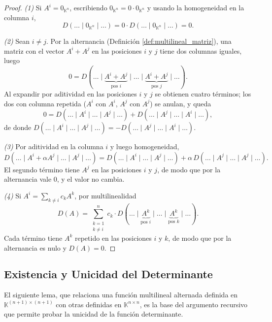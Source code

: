\documentclass[11pt, a4paper]{article}
\begin{document}
\begin{proof}
\textit{(1)} Si $A^i = 0_{\mathbb{K}^n}$, escribiendo $0_{\mathbb{K}^n} = 0 \cdot 0_{\mathbb{K}^n}$ y usando la homogeneidad en la columna $i$,
\[
D(\dots \mid 0_{\mathbb{K}^n} \mid \dots) = 0 \cdot D(\dots \mid 0_{\mathbb{K}^n} \mid \dots) = 0.
\]

\textit{(2)} Sean $i \neq j$. Por la alternancia (Definición \ref{def:multilineal_matriz}), una matriz con el vector $A^i + A^j$ en las posiciones $i$ y $j$ tiene dos columnas iguales, luego
\[
0 = D(\dots \mid \underbrace{A^i+A^j}_{\text{pos } i} \mid \dots \mid \underbrace{A^i+A^j}_{\text{pos } j} \mid \dots).
\]
Al expandir por aditividad en las posiciones $i$ y $j$ se obtienen cuatro términos; los dos con columna repetida ($A^i$ con $A^i$, $A^j$ con $A^j$) se anulan, y queda
\[
0 = D(\dots \mid A^i \mid \dots \mid A^j \mid \dots) + D(\dots \mid A^j \mid \dots \mid A^i \mid \dots),
\]
de donde $D(\dots \mid A^i \mid \dots \mid A^j \mid \dots) = - D(\dots \mid A^j \mid \dots \mid A^i \mid \dots)$.

\textit{(3)} Por aditividad en la columna $i$ y luego homogeneidad,
\[
D(\dots \mid A^i + \alpha A^j \mid \dots \mid A^j \mid \dots) = D(\dots \mid A^i \mid \dots \mid A^j \mid \dots) + \alpha\, D(\dots \mid A^j \mid \dots \mid A^j \mid \dots).
\]
El segundo término tiene $A^j$ en las posiciones $i$ y $j$, de modo que por la alternancia vale $0$, y el valor no cambia.

\textit{(4)} Si $A^i = \sum_{k \neq i} c_k A^k$, por multilinealidad
\[
D(A) = \sum_{\substack{k=1 \\ k \neq i}}^{n} c_k \cdot D(\dots \mid \underbrace{A^k}_{\text{pos } i} \mid \dots \mid \underbrace{A^k}_{\text{pos } k} \mid \dots).
\]
Cada término tiene $A^k$ repetido en las posiciones $i$ y $k$, de modo que por la alternancia es nulo y $D(A) = 0$.
\end{proof}

\subsection{Existencia y Unicidad del Determinante}

El siguiente lema, que relaciona una función multilineal alternada definida en $\mathbb{K}^{(n+1) \times (n+1)}$ con otras definidas en $\mathbb{K}^{n \times n}$, es la base del argumento recursivo que permite probar la unicidad de la función determinante.
\end{document}
